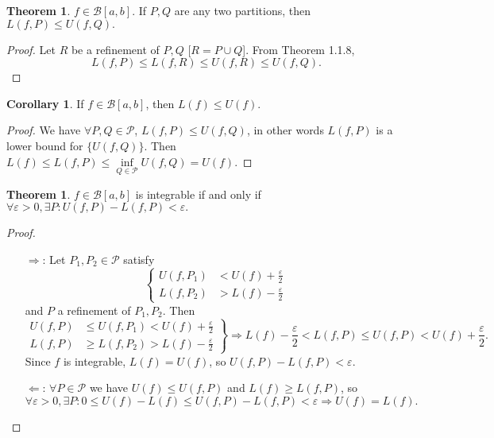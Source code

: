 \documentclass[a4paper]{article}
\theoremstyle{definition}
\newtheorem{thm}[defn]{Theorem}
\newtheorem{coro}[defn]{Corollary}
\begin{document}
\begin{thm}
	$f\in \mathcal B [a,b]$. If $P,Q$ are any two partitions, then $L(f,P) \leq U(f,Q) .$
\end{thm}

\begin{proof}
	Let $R$ be a refinement of $P,Q$ [$R=P\cup Q$]. From Theorem 1.1.8,
\[
L(f,P)\leq L(f,R)\leq U(f,R)\leq U(f,Q) .
\]
\end{proof}

\begin{coro}
	If $f\in \mathcal B [a,b]$, then $L(f)\leq U(f)$.
\end{coro}

\begin{proof}
	We have $\forall P,Q \in \mathcal P$, $L(f,P) \leq U(f,Q)$, in other words $L(f,P)$ is a lower bound for $\{U(f,Q)\}$. Then $L(f) \leq L(f,P) \leq \underset{Q\in \mathcal P}{\inf} U(f,Q)=U(f) .$
\end{proof}

\begin{thm}
	$f\in \mathcal B [a,b]$ is integrable if and only if $\forall \varepsilon >0, \exists P : U(f,P)-L(f,P)<\varepsilon .$
\end{thm}

\begin{proof}
	\begin{itemize}
		\item[$\Rightarrow$:] Let $P_1,P_2 \in \mathcal P$ satisfy
\[
\left\{\begin{aligned}
			U(f,P_1) &< U(f)+\frac{\varepsilon}2 \\ L(f,P_2) &> L(f)-\frac{\varepsilon}2
		\end{aligned} \right.
\]
and $P$ a refinement of $P_1,P_2$. Then
\[
\left.\begin{aligned}
			U(f,P)&\leq U(f,P_1)<U(f)+\frac{\varepsilon}{2} \\ L(f,P)&\geq L(f,P_2)>L(f)-\frac{\varepsilon}2
		\end{aligned} \right\} \Rightarrow L(f)-\frac{\varepsilon}2 < L(f,P) \leq U(f,P) < U(f)+\frac{\varepsilon}2 .
\]
Since $f$ is integrable, $L(f)=U(f)$, so $U(f,P)-L(f,P) < \varepsilon .$
		\item[$\Leftarrow$:] $\forall P \in \mathcal P$ we have $U(f) \leq U(f,P)$ and $L(f) \geq L(f,P)$, so
\[
\forall \varepsilon >0, \exists P : 0\leq U(f)-L(f) \leq U(f,P)-L(f,P) < \varepsilon \Rightarrow U(f)=L(f) .
\]
	\end{itemize}
\end{proof}
\end{document}
